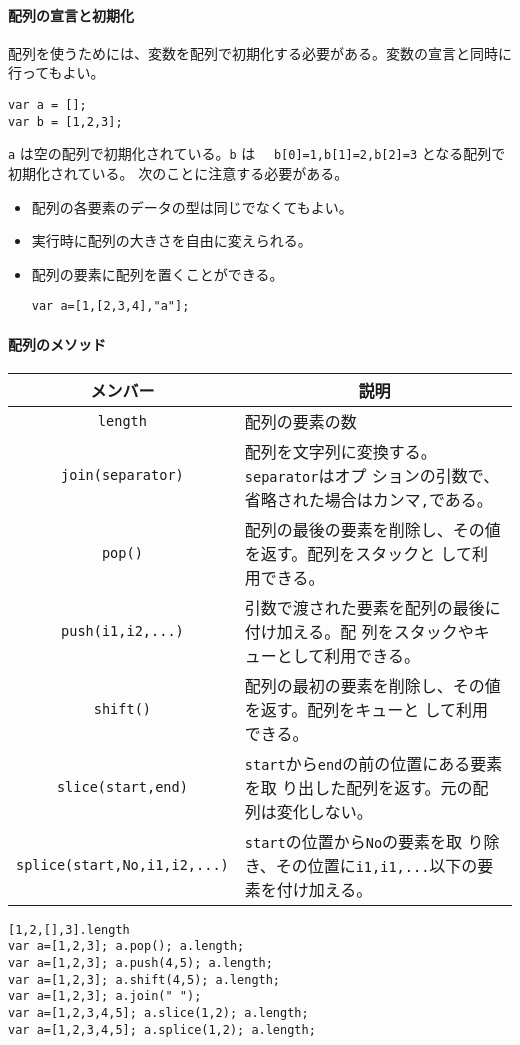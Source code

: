 \documentclass[a4j]{jarticle}
\begin{document}
\paragraph{配列の宣言と初期化}
配列を使うためには、変数を配列で初期化する必要がある。変数の宣言と同時に
行ってもよい。
\begin{Verbatim}
var a = [];
var b = [1,2,3];
\end{Verbatim}
\verb+a+ は空の配列で初期化されている。\verb+b+ は　
\verb+b[0]=1,b[1]=2,b[2]=3+ となる配列で初期化されている。
次のことに注意する必要がある。
\begin{itemize}
 \item 配列の各要素のデータの型は同じでなくてもよい。
 \item 実行時に配列の大きさを自由に変えられる。
 \item 配列の要素に配列を置くことができる。
\begin{Verbatim}
var a=[1,[2,3,4],"a"];
\end{Verbatim}
\end{itemize}
\paragraph{配列のメソッド}
\begin{center}
 \begin{tabular}{|c|m{}|}\hline
 メンバー&\multicolumn{1}{c|}{説明} \\\hline
  \verb+length+ &配列の要素の数\\ \hline
  \verb+join(separator)+& 配列を文字列に変換する。\verb+separator+はオプ
      ションの引数で、省略された場合はカンマ\verb+,+である。\\ \hline
  \verb+pop()+& 配列の最後の要素を削除し、その値を返す。配列をスタックと
      して利用できる。\\ \hline
  \verb+push(i1,i2,...)+& 引数で渡された要素を配列の最後に付け加える。配
      列をスタックやキューとして利用できる。\\ \hline
  \verb+shift()+&配列の最初の要素を削除し、その値を返す。配列をキューと
      して利用できる。\\ \hline
  \verb+slice(start,end)+&\verb+start+から\verb+end+の前の位置にある要素を取
      り出した配列を返す。元の配列は変化しない。\\ \hline
  \verb+splice(start,No,i1,i2,...)+&\verb+start+の位置から\verb+No+の要素を取
      り除き、その位置に\verb+i1,i1,...+以下の要素を付け加える。\\ \hline
\end{tabular}
\end{center}
\begin{Verbatim}
[1,2,[],3].length
var a=[1,2,3]; a.pop(); a.length;
var a=[1,2,3]; a.push(4,5); a.length;
var a=[1,2,3]; a.shift(4,5); a.length;
var a=[1,2,3]; a.join(" ");
var a=[1,2,3,4,5]; a.slice(1,2); a.length;
var a=[1,2,3,4,5]; a.splice(1,2); a.length;
\end{Verbatim}
\end{document}
